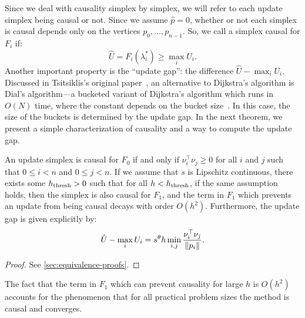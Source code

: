 \documentclass[sisc-eikonal.tex]{subfiles}
\begin{document}
Since we deal with causality simplex by simplex, we will refer to each
update simplex being causal or not. Since we assume $\hat{p} = 0$,
whether or not each simplex is causal depends only on the vertices
$p_0, \hdots, p_{n-1}$. So, we call a simplex causal for $F_i$ if:
\begin{equation}
  \hat{U} = F_i(\lambda_i^*) \geq \max_i U_i.
\end{equation}
Another important property is the ``update gap'': the difference
$\hat{U} - \max_i U_i$. Discussed in Tsitsiklis's original
paper~\cite{tsitsiklis1995efficient}, an alternative to Dijkstra's
algorithm is Dial's algorithm---a bucketed variant of Dijkstra's
algorithm which runs in $O(N)$ time, where the constant depends on the
bucket size~\cite{dial1969algorithm,kim2001calo}. In this case, the
size of the buckets is determined by the update gap. In the next
theorem, we present a simple characterization of causality and a way
to compute the update gap.

\begin{theorem}\label{thm:causality}
  An update simplex is causal for $F_0$ if and only if
  $\nu_i^\top \nu_j \geq 0$ for all $i$ and $j$ such that
  $0 \leq i < n$ and $0 \leq j < n$. If we assume that $s$ is
  Lipschitz continuous, there exists some $h_{\operatorname{thresh}} > 0$ such that for
  all $h < h_{\operatorname{thresh}}$, if the same assumption holds, then the simplex
  is also causal for $F_1$, and the term in $F_1$ which prevents an
  update from being causal decays with order $O(h^2)$. Furthermore,
  the update gap is given explicitly by:
  \begin{equation}
    \hat{U} - \max_i U_i = s^\theta h \min_{i, j} \frac{\nu_i^\top \nu_j}{\left\|p_i\right\|}.
  \end{equation}
\end{theorem}

\begin{proof}
  See \cref{sec:equivalence-proofs}.
\end{proof}

\noindent The fact that the term in $F_1$ which can prevent causality
for large $h$ is $O(h^2)$ accounts for the phenomenon that for all
practical problem sizes the method is causal and converges.
\end{document}
